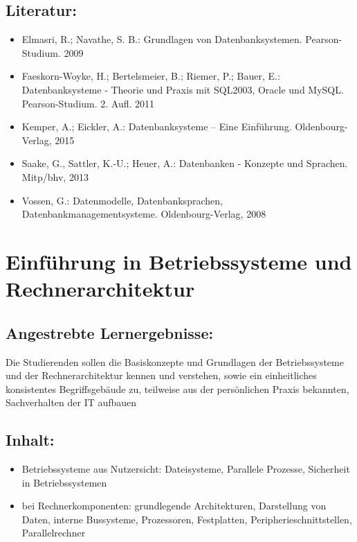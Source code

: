 \section*{Literatur:}\label{literatur-5}

\begin{itemize}
\item
  Elmasri, R.; Navathe, S. B.: Grundlagen von Datenbanksystemen.
  Pearson-Studium. 2009
\item
  Faeskorn-Woyke, H.; Bertelsmeier, B.; Riemer, P.; Bauer, E.:
  Datenbanksysteme - Theorie und Praxis mit SQL2003, Oracle und MySQL.
  Pearson-Studium. 2. Aufl. 2011
\item
  Kemper, A.; Eickler, A.: Datenbanksysteme -- Eine Einführung.
  Oldenbourg-Verlag, 2015
\item
  Saake, G., Sattler, K.-U.; Heuer, A.: Datenbanken - Konzepte und
  Sprachen. Mitp/bhv, 2013
\item
  Vossen, G.: Datenmodelle, Datenbanksprachen,
  Datenbankmanagementsysteme. Oldenbourg-Verlag, 2008
\end{itemize}

\chapter{Einführung in Betriebssysteme und
Rechnerarchitektur}\label{einfuxfchrung-in-betriebssysteme-und-rechnerarchitektur}

\section*{Angestrebte
Lernergebnisse:}\label{angestrebte-lernergebnisse-8}

Die Studierenden sollen die Basiskonzepte und Grundlagen der
Betriebssysteme und der Rechnerarchitektur kennen und verstehen, sowie
ein einheitliches konsistentes Begriffsgebäude zu, teilweise aus der
persönlichen Praxis bekannten, Sachverhalten der IT aufbauen

\section*{Inhalt:}\label{inhalt-8}

\begin{itemize}
\item
  Betriebssysteme aus Nutzersicht: Dateisysteme, Parallele Prozesse,
  Sicherheit in Betriebssystemen
\item
  bei Rechnerkomponenten: grundlegende Architekturen, Darstellung von
  Daten, interne Bussysteme, Prozessoren, Festplatten,
  Peripherieschnittstellen, Parallelrechner
\end{itemize}

